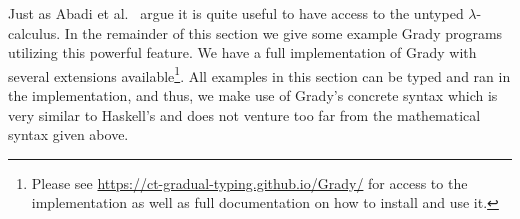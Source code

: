 Just as Abadi et al.~\cite{Abadi:1989} argue it is quite useful to
have access to the untyped $\lambda$-calculus.  In the remainder of
this section we give some example Grady programs utilizing this
powerful feature.  We have a full implementation of Grady with several
extensions available\footnote{Please see
  \url{https://ct-gradual-typing.github.io/Grady/} for access to the
  implementation as well as full documentation on how to install and
  use it.}.  All examples in this section can be typed and ran in the
implementation, and thus, we make use of Grady's concrete syntax which
is very similar to Haskell's and does not venture too far from the
mathematical syntax given above.

